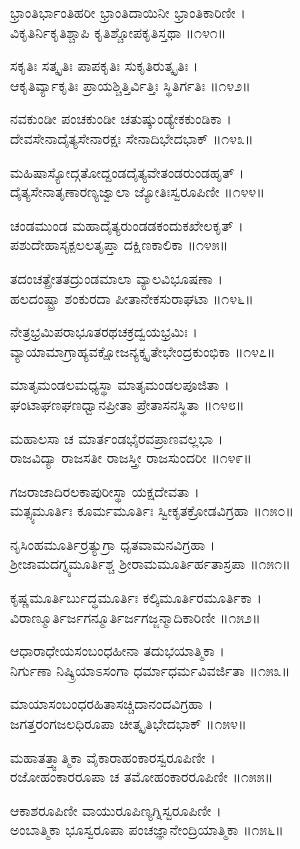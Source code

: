 ಭ್ರಾಂತಿರ್ಭಾಂತಿಹರೀ ಭ್ರಾಂತಿದಾಯಿನೀ ಭ್ರಾಂತಿಕಾರಿಣೀ ।\\
ವಿಕೃತಿರ್ನಿಕೃತಿಶ್ಚಾಪಿ ಕೃತಿಶ್ಚೋಪಕೃತಿಸ್ತಥಾ ॥೧೪೧॥

ಸಕೃತಿಃ ಸತ್ಕೃತಿಃ ಪಾಪಕೃತಿಃ ಸುಕೃತಿರುತ್ಕೃತಿಃ ।\\
ಆಕೃತಿರ್ವ್ಯಾಕೃತಿಃ ಪ್ರಾಯಶ್ಚಿತ್ತಿರ್ವಿತ್ತಿಃ ಸ್ಥಿತಿರ್ಗತಿಃ ॥೧೪೨॥

ನವಕುಂಡೀ ಪಂಚಕುಂಡೀ ಚತುಷ್ಕುಂಡ್ಯೇಕಕುಂಡಿಕಾ ।\\
ದೇವಸೇನಾದೈತ್ಯಸೇನಾರಕ್ಷಃ ಸೇನಾದಿಭೇದಭಾಕ್ ॥೧೪೩॥

ಮಹಿಷಾಸ್ಯೋದ್ಗತೋದ್ದಂಡದೈತ್ಯವೇತಂಡರುಂಡಹೃತ್ ।\\
ದೈತ್ಯಸೇನಾತೃಣಾರಣ್ಯಜ್ವಾಲಾ ಜ್ಯೋತಿಃಸ್ವರೂಪಿಣೀ ॥೧೪೪॥

ಚಂಡಮುಂಡ ಮಹಾದೈತ್ಯರುಂಡಡಕಂದುಕಖೇಲಕೃತ್ ।\\
ಪಶುದೇಹಾಸೃಕ್ಪಲಲತೃಪ್ತಾ ದಕ್ಷಿಣಕಾಲಿಕಾ ॥೧೪೫॥

ತದಂಚತ್ಪ್ರೇತತದ್ರುಂಡಮಾಲಾ ವ್ಯಾಲವಿಭೂಷಣಾ ।\\
ಹಲದಂಷ್ಟ್ರಾ ಶಂಕುರದಾ ಪೀತಾನೇಕಸುರಾಘಟಾ ॥೧೪೬॥

ನೇತ್ರಭ್ರಮಿಪರಾಭೂತರಥಚಕ್ರದ್ವಯಭ್ರಮಿಃ ।\\
ವ್ಯಾಯಾಮಾಗ್ರಾಹ್ಯವಕ್ಷೋಜನ್ಯಕ್ಕೃತೇಭೇಂದ್ರಕುಂಭಿಕಾ ॥೧೪೭॥

ಮಾತೃಮಂಡಲಮಧ್ಯಸ್ಥಾ ಮಾತೃಮಂಡಲಪೂಜಿತಾ ।\\
ಘಂಟಾಘಣಘಣಧ್ವಾನಪ್ರೀತಾ ಪ್ರೇತಾಸನಸ್ಥಿತಾ ॥೧೪೮॥

ಮಹಾಲಸಾ ಚ ಮಾರ್ತಂಡಭೈರವಪ್ರಾಣವಲ್ಲಭಾ ।\\
ರಾಜವಿದ್ಯಾ ರಾಜಸತೀ ರಾಜಸ್ತ್ರೀ ರಾಜಸುಂದರೀ ॥೧೪೯॥

ಗಜರಾಜಾದಿರಲಕಾಪುರೀಸ್ಥಾ ಯಕ್ಷದೇವತಾ ।\\
ಮತ್ಸ್ಯಮೂರ್ತಿಃ ಕೂರ್ಮಮೂರ್ತಿಃ ಸ್ವೀಕೃತಕ್ರೋಡವಿಗ್ರಹಾ ॥೧೫೦॥

ನೃಸಿಂಹಮೂರ್ತಿರ್ರತ್ಯುಗ್ರಾ ಧೃತವಾಮನವಿಗ್ರಹಾ ।\\
ಶ್ರೀಜಾಮದಗ್ನ್ಯಮೂರ್ತಿಶ್ಚ ಶ್ರೀರಾಮಮೂರ್ತಿರ್ಹತಾಸ್ರಪಾ ॥೧೫೧॥

ಕೃಷ್ಣಮೂರ್ತಿರ್ಬುದ್ಧಮೂರ್ತಿಃ ಕಲ್ಕಿಮೂರ್ತಿರಮೂರ್ತಿಕಾ ।\\
ವಿರಾಣ್ಮೂರ್ತಿರ್ಜಗನ್ಮೂರ್ತಿರ್ಜಗಜ್ಜನ್ಮಾದಿಕಾರಿಣೀ ॥೧೫೨॥

ಆಧಾರಾಧೇಯಸಂಬಂಧಹೀನಾ ತದುಭಯಾತ್ಮಿಕಾ ।\\
ನಿರ್ಗುಣಾ ನಿಷ್ಕ್ರಿಯಾಽಸಂಗಾ ಧರ್ಮಾಧರ್ಮವಿವರ್ಜಿತಾ ॥೧೫೩॥

ಮಾಯಾಸಂಬಂಧರಹಿತಾಸಚ್ಚಿದಾನಂದವಿಗ್ರಹಾ ।\\
ಜಗತ್ತರಂಗಜಲಧಿರೂಪಾ ಚೀತ್ಕೃತಿಭೇದಭಾಕ್ ॥೧೫೪॥

ಮಹಾತತ್ತ್ವಾತ್ಮಿಕಾ ವೈಕಾರಾಹಂಕಾರಸ್ವರೂಪಿಣೀ ।\\
ರಜೋಹಂಕಾರರೂಪಾ ಚ ತಮೋಹಂಕಾರರೂಪಿಣೀ ॥೧೫೫॥

ಆಕಾಶರೂಪಿಣೀ ವಾಯುರೂಪಿಣ್ಯಗ್ನಿಸ್ವರೂಪಿಣೀ ।\\
ಅಂಬಾತ್ಮಿಕಾ ಭೂಸ್ವರೂಪಾ ಪಂಚಜ್ಞಾನೇಂದ್ರಿಯಾತ್ಮಿಕಾ ॥೧೫೬॥


